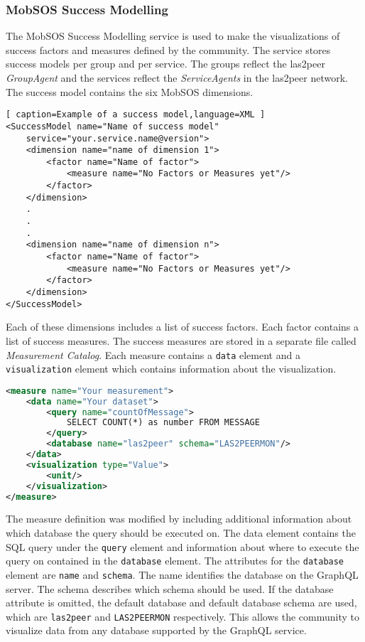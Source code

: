\subsubsection{MobSOS Success Modelling}
The MobSOS Success Modelling service is used to make the visualizations of success factors and measures defined by the community. The service stores success models per group and per service. 
The groups reflect the las2peer \emph{GroupAgent} and the services reflect the \emph{ServiceAgents} in the las2peer network.
The success model contains the six MobSOS dimensions.
\begin{lstlisting}[ caption=Example of a success model,language=XML ]
<SuccessModel name="Name of success model" 
    service="your.service.name@version">
    <dimension name="name of dimension 1">
        <factor name="Name of factor">
            <measure name="No Factors or Measures yet"/>
        </factor>
    </dimension>
    .
    .
    .
    <dimension name="name of dimension n">
        <factor name="Name of factor">
            <measure name="No Factors or Measures yet"/>
        </factor>
    </dimension>
</SuccessModel>
\end{lstlisting}
Each of these dimensions includes a list of success factors.
Each factor contains a list of success measures. The success measures are stored in a separate file called \emph{Measurement Catalog}. Each measure contains a \texttt{data} element and a \texttt{visualization} element which contains information about the visualization.

\begin{lstlisting}[language=XML, caption= example of a Measure]
<measure name="Your measurement">
    <data name="Your dataset">
        <query name="countOfMessage">
            SELECT COUNT(*) as number FROM MESSAGE
        </query>
        <database name="las2peer" schema="LAS2PEERMON"/>
    </data>
    <visualization type="Value">
        <unit/>
    </visualization>
</measure>
\end{lstlisting}

The measure definition was modified by including additional information about which database the query should be executed on. The data element contains the SQL query under the \texttt{query} element and information about where to execute the query on contained in the \texttt{database} element.
The attributes for the \texttt{database} element are \texttt{name} and \texttt{schema}. The name identifies the database on the GraphQL server. The schema describes which schema should be used.
If the database attribute is omitted, the default database and default database schema are used, which are \texttt{las2peer} and \texttt{LAS2PEERMON} respectively.
This allows the community to visualize data from any database supported by the GraphQL service.

